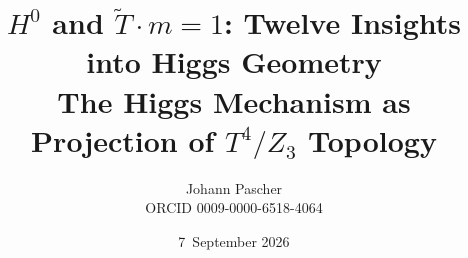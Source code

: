 \documentclass[11pt,a4paper]{report}
\title{$H^0$ and $\tilde{T}\cdot m=1$: Twelve Insights into Higgs Geometry\\[0.5em]
  \large The Higgs Mechanism as Projection of $T^4/Z_3$ Topology}
\date{7~September 2026}
\author{Johann Pascher\\\small ORCID 0009-0000-6518-4064}
\begin{document}
\renewcommand{\thechapter}{}
\renewcommand{\thesection}{\arabic{section}}
\maketitle
\tableofcontents

\end{document}
